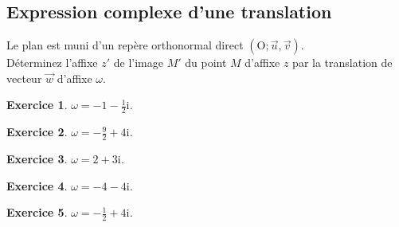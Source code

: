 \documentclass[a4paper]{article}
\newtheorem{Exercice}{Exercice}
\begin{document}
\begin{minipage}{0.45\linewidth}
\vspace{0.5cm}
\begin{center}
\subsection*{Expression complexe d'une translation}
\end{center}%
\vspace{0.5cm}%
Le plan est muni d'un rep\`ere orthonormal direct $\left(\mathrm{O};\vec{u},\vec{v}\right)$.\\D\'eterminez l'affixe $z'$ de l'image $M'$ du point $M$ d'affixe $z$ par la translation de vecteur $\vec{w}$ d'affixe $\omega$.
\begin{Exercice}
$\displaystyle \omega=-1-\frac{1}{2}\mathrm{i}$.
\end{Exercice}\begin{Exercice}
$\displaystyle \omega=-\frac{9}{2}+4\mathrm{i}$.
\end{Exercice}\begin{Exercice}
$\displaystyle \omega=2+3\mathrm{i}$.
\end{Exercice}\begin{Exercice}
$\displaystyle \omega=-4-4\mathrm{i}$.
\end{Exercice}\begin{Exercice}
$\displaystyle \omega=-\frac{1}{2}+4\mathrm{i}$.
\end{Exercice}
\end{minipage}




\newpage
\end{document}
